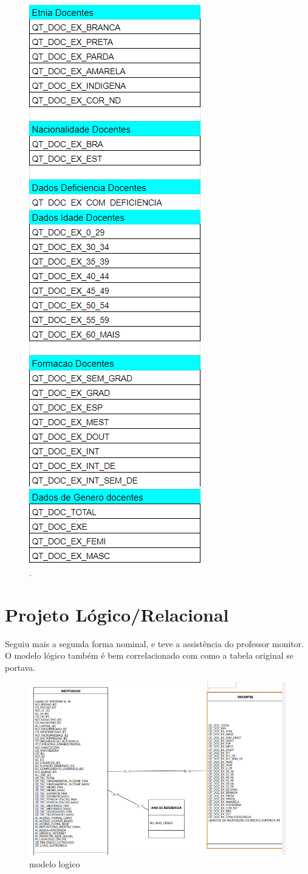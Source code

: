 \documentclass[12pt]{article}
\begin{document}
\begin{figure}[h!]
\centering
\includegraphics[width=.3\textwidth]{Terceira forma nominal 5.PNG}
\caption{.}

\centering
\includegraphics[width=.3\textwidth]{Terceira forma nominal 6.PNG}
\caption{.}

\centering
\includegraphics[width=.3\textwidth]{Terceira forma nominal 7.PNG}
\caption{.}

\end{figure}



\section{Projeto Lógico/Relacional}

Seguiu mais a segunda forma nominal, e teve a assistência do professor monitor. O modelo lógico também é bem correlacionado com como a tabela original se portava.

\begin{figure}[h!]
\centering
\includegraphics[width=.9\textwidth]{modelo logico.PNG}
\caption{modelo logico}
\end{figure}
\end{document}

